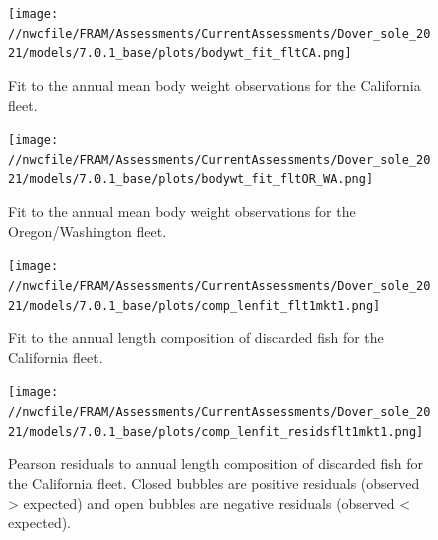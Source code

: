 \documentclass[11pt,
  english,
  a4paper,
]{article}
\begin{document}
\tagmcend\tagstructend


\begin{figure}
\centering
\texttt{[image: //nwcfile/FRAM/Assessments/CurrentAssessments/Dover\_sole\_2021/models/7.0.1\_base/plots/bodywt\_fit\_fltCA.png]}
\caption{Fit to the annual mean body weight observations for the California fleet.\label{fig:ca-disc-mbw-fit}}
\end{figure}

\tagmcend\tagstructend


\begin{figure}
\centering
\texttt{[image: //nwcfile/FRAM/Assessments/CurrentAssessments/Dover\_sole\_2021/models/7.0.1\_base/plots/bodywt\_fit\_fltOR\_WA.png]}
\caption{Fit to the annual mean body weight observations for the Oregon/Washington fleet.\label{fig:orwa-disc-mbw-fit}}
\end{figure}

\tagmcend\tagstructend


\begin{figure}
\centering
\texttt{[image: //nwcfile/FRAM/Assessments/CurrentAssessments/Dover\_sole\_2021/models/7.0.1\_base/plots/comp\_lenfit\_flt1mkt1.png]}
\caption{Fit to the annual length composition of discarded fish for the California fleet.\label{fig:ca-disc-len-fit}}
\end{figure}

\tagmcend\tagstructend


\begin{figure}
\centering
\texttt{[image: //nwcfile/FRAM/Assessments/CurrentAssessments/Dover\_sole\_2021/models/7.0.1\_base/plots/comp\_lenfit\_residsflt1mkt1.png]}
\caption{Pearson residuals to annual length composition of discarded fish for the California fleet. Closed bubbles are positive residuals (observed \textgreater{} expected) and open bubbles are negative residuals (observed \textless{} expected).\label{fig:ca-disc-pearson}}
\end{figure}
\end{document}
